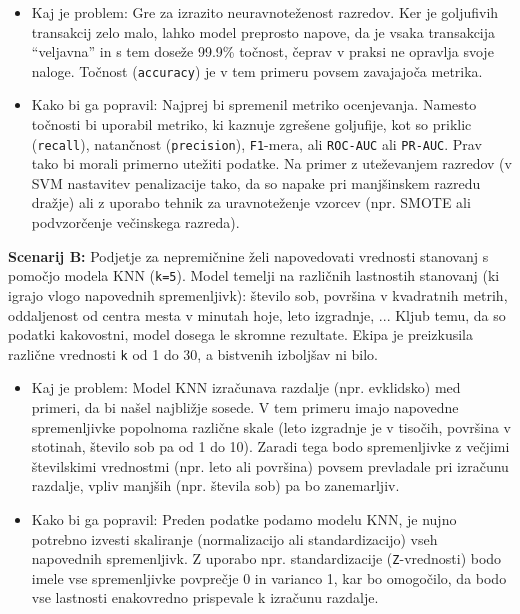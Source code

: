 ﻿\documentclass[12pt,a4paper]{article}
\begin{document}
\begin{itemize}
    \item Kaj je problem: Gre za izrazito neuravnoteženost razredov. Ker je goljufivih transakcij zelo malo, lahko model preprosto napove, da je vsaka transakcija ``veljavna'' in s tem doseže 99.9\% točnost, čeprav v praksi ne opravlja svoje naloge. Točnost (\texttt{accuracy}) je v tem primeru povsem zavajajoča metrika.
    \item Kako bi ga popravil: Najprej bi spremenil metriko ocenjevanja. Namesto točnosti bi uporabil metriko, ki kaznuje zgrešene goljufije, kot so priklic (\texttt{recall}), natančnost (\texttt{precision}), \texttt{F1}-mera, ali \texttt{ROC-AUC} ali \texttt{PR-AUC}. Prav tako bi morali primerno utežiti podatke. Na primer z uteževanjem razredov (v SVM nastavitev penalizacije tako, da so napake pri manjšinskem razredu dražje) ali z uporabo tehnik za uravnoteženje vzorcev (npr. SMOTE ali podvzorčenje večinskega razreda).
\end{itemize}

\textbf{Scenarij B:} Podjetje za nepremičnine želi napovedovati vrednosti stanovanj s pomočjo modela KNN (\texttt{k=5}). Model temelji na različnih lastnostih stanovanj (ki igrajo vlogo napovednih spremenljivk): število sob, površina v kvadratnih metrih, oddaljenost od centra mesta v minutah hoje, leto izgradnje, ... Kljub temu, da so podatki kakovostni, model dosega le skromne rezultate. Ekipa je preizkusila različne vrednosti \texttt{k} od 1 do 30, a bistvenih izboljšav ni bilo.

\begin{itemize}
    \item Kaj je problem: Model KNN izračunava razdalje (npr. evklidsko) med primeri, da bi našel najbližje sosede. V tem primeru imajo napovedne spremenljivke popolnoma različne skale (leto izgradnje je v tisočih, površina v stotinah, število sob pa od 1 do 10). Zaradi tega bodo spremenljivke z večjimi številskimi vrednostmi (npr. leto ali površina) povsem prevladale pri izračunu razdalje, vpliv manjših (npr. števila sob) pa bo zanemarljiv.
    \item Kako bi ga popravil: Preden podatke podamo modelu KNN, je nujno potrebno izvesti skaliranje (normalizacijo ali standardizacijo) vseh napovednih spremenljivk. Z uporabo npr. standardizacije (\texttt{Z}-vrednosti) bodo imele vse spremenljivke povprečje 0 in varianco 1, kar bo omogočilo, da bodo vse lastnosti enakovredno prispevale k izračunu razdalje.
\end{itemize}
\end{document}
